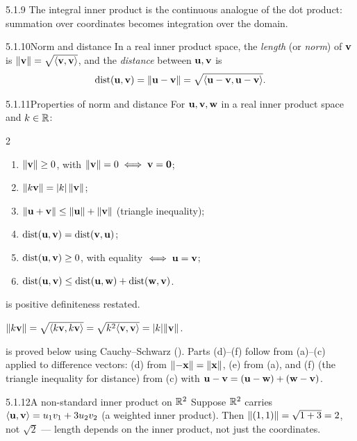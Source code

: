 \begin{rmks}{5.1.9}
The integral inner product is the continuous analogue of the dot product: summation over coordinates becomes integration over the domain.
\end{rmks}

\begin{defns}{5.1.10}{Norm and distance}
In a real inner product space, the \emph{length} (or \emph{norm}) of $\mathbf{v}$ is $\lVert \mathbf{v} \rVert=\sqrt{\langle \mathbf{v}, \mathbf{v} \rangle}$, and the \emph{distance} between $\mathbf{u},\mathbf{v}$ is
\[
\operatorname{dist}(\mathbf{u},\mathbf{v})=\lVert \mathbf{u}-\mathbf{v} \rVert=\sqrt{\langle \mathbf{u}-\mathbf{v}, \mathbf{u}-\mathbf{v} \rangle}.
\]
\end{defns}

\begin{thms}{5.1.11}{Properties of norm and distance}
For $\mathbf{u},\mathbf{v},\mathbf{w}$ in a real inner product space and $k\in\mathbb{R}$:
\begin{multicols}{2}
\begin{enumerate}[label=\textup{(\alph*)},leftmargin=1.6em,itemsep=1pt]
\item $\lVert \mathbf{v} \rVert\ge0$, with $\lVert \mathbf{v} \rVert=0\iff\mathbf{v}=\mathbf{0}$;
\item $\lVert k\mathbf{v} \rVert=\lvert k \rvert\,\lVert \mathbf{v} \rVert$;
\item $\lVert \mathbf{u}+\mathbf{v} \rVert\le\lVert \mathbf{u} \rVert+\lVert \mathbf{v} \rVert$ (triangle inequality);
\item $\operatorname{dist}(\mathbf{u},\mathbf{v})=\operatorname{dist}(\mathbf{v},\mathbf{u})$;
\item $\operatorname{dist}(\mathbf{u},\mathbf{v})\ge0$, with equality $\iff\mathbf{u}=\mathbf{v}$;
\item $\operatorname{dist}(\mathbf{u},\mathbf{v})\le\operatorname{dist}(\mathbf{u},\mathbf{w})+\operatorname{dist}(\mathbf{w},\mathbf{v})$.
\end{enumerate}
\end{multicols}
\end{thms}

\begin{prf}
 is positive definiteness restated.

 $\lVert k\mathbf{v} \rVert=\sqrt{\langle k\mathbf{v}, k\mathbf{v} \rangle}=\sqrt{k^2\langle \mathbf{v}, \mathbf{v} \rangle}=\lvert k \rvert\lVert \mathbf{v} \rVert$.

 is proved below using Cauchy--Schwarz (). Parts (d)--(f) follow from (a)--(c) applied to difference vectors: (d) from $\lVert -\mathbf{x} \rVert=\lVert \mathbf{x} \rVert$, (e) from (a), and (f) (the triangle inequality for distance) from (c) with $\mathbf{u}-\mathbf{v}=(\mathbf{u}-\mathbf{w})+(\mathbf{w}-\mathbf{v})$.
\end{prf}

\begin{exmp}{5.1.12}{A non-standard inner product on $\mathbb{R}^2$}
Suppose $\mathbb{R}^2$ carries $\langle \mathbf{u}, \mathbf{v} \rangle=u_1v_1+3u_2v_2$ (a weighted inner product). Then $\lVert (1,1) \rVert=\sqrt{1+3}=2$, not $\sqrt2$ --- length depends on the inner product, not just the coordinates.
\end{exmp}

